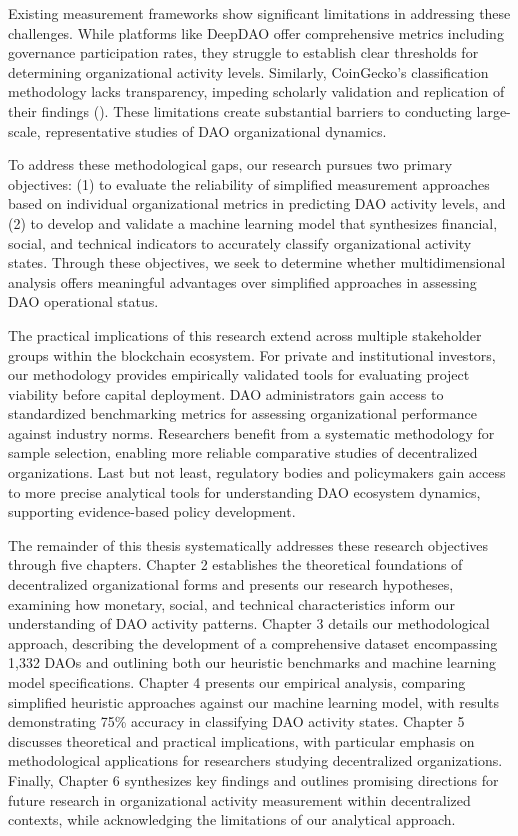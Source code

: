 Existing measurement frameworks show significant limitations in addressing these challenges. While platforms like DeepDAO offer comprehensive metrics including governance participation rates, they struggle to establish clear thresholds for determining organizational activity levels. Similarly, CoinGecko's classification methodology lacks transparency, impeding scholarly validation and replication of their findings (\cite{Lee_2024}). These limitations create substantial barriers to conducting large-scale, representative studies of DAO organizational dynamics.

To address these methodological gaps, our research pursues two primary objectives: (1) to evaluate the reliability of simplified measurement approaches based on individual organizational metrics in predicting DAO activity levels, and (2) to develop and validate a machine learning model that synthesizes financial, social, and technical indicators to accurately classify organizational activity states. Through these objectives, we seek to determine whether multidimensional analysis offers meaningful advantages over simplified approaches in assessing DAO operational status.

The practical implications of this research extend across multiple stakeholder groups within the blockchain ecosystem. For private and institutional investors, our methodology provides empirically validated tools for evaluating project viability before capital deployment. DAO administrators gain access to standardized benchmarking metrics for assessing organizational performance against industry norms. Researchers benefit from a systematic methodology for sample selection, enabling more reliable comparative studies of decentralized organizations. Last but not least, regulatory bodies and policymakers gain access to more precise analytical tools for understanding DAO ecosystem dynamics, supporting evidence-based policy development.


The remainder of this thesis systematically addresses these research objectives through five chapters. Chapter 2 establishes the theoretical foundations of decentralized organizational forms and presents our research hypotheses, examining how monetary, social, and technical characteristics inform our understanding of DAO activity patterns. Chapter 3 details our methodological approach, describing the development of a comprehensive dataset encompassing 1,332 DAOs and outlining both our heuristic benchmarks and machine learning model specifications. Chapter 4 presents our empirical analysis, comparing simplified heuristic approaches against our machine learning model, with results demonstrating 75\% accuracy in classifying DAO activity states. Chapter 5 discusses theoretical and practical implications, with particular emphasis on methodological applications for researchers studying decentralized organizations. Finally, Chapter 6 synthesizes key findings and outlines promising directions for future research in organizational activity measurement within decentralized contexts, while acknowledging the limitations of our analytical approach.